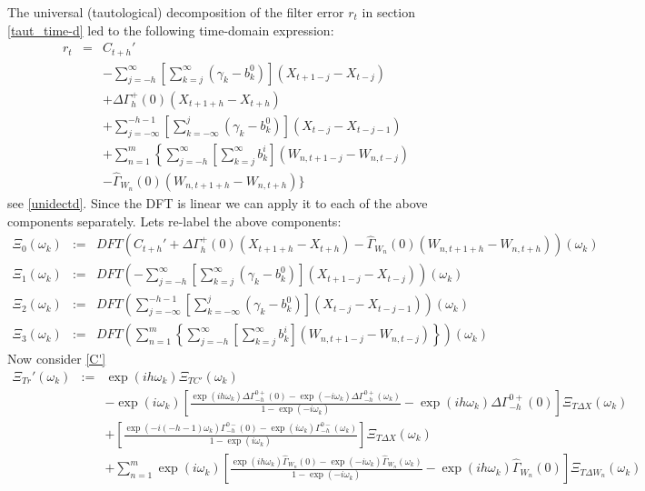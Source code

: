 \documentclass[11pt]{article}
\begin{document}
\begin{appendix}
The universal (tautological) decomposition of the filter error $r_t$ in section \ref{taut_time-d} led to the following time-domain expression:
\begin{eqnarray}
r_t&=&C_{t+h}'\nonumber\\
&&-\sum_{j=-h}^\infty
\left[\sum_{k=j}^\infty({\gamma}_{k}-b_k^0)\right]
(X_{t+1-j}-X_{t-j})\nonumber\\
&&+\Delta\Gamma_{h}^+(0)
(X_{t+1+h}-X_{t+h})\nonumber\\
&&+\sum_{j=-\infty}^{-h-1}\left[\sum_{k=-\infty}^j(\gamma_k-b_k^0)\right](X_{t-j}-X_{t-j-1})\nonumber\\
&&+\sum_{n=1}^m\left\{\sum_{j=-h}^\infty
\left[\sum_{k=j}^\infty b_k^i\right]
(W_{n,t+1-j}-W_{n,t-j})\right.\nonumber\\
&&-\hat{\Gamma}_{W_n}(0)(W_{n,t+1+h}-W_{n,t+h})\Bigg\}\nonumber
\end{eqnarray}
see \ref{unidectd}. Since the DFT is linear we can apply it to each of the above components separately. Lets re-label the above components:
\begin{eqnarray*}
\Xi_0(\omega_k)&:=&DFT\left(C_{t+h}'+\Delta\Gamma_{h}^+(0)
(X_{t+1+h}-X_{t+h})-\hat{\Gamma}_{W_n}(0)(W_{n,t+1+h}-W_{n,t+h})\right)(\omega_k)\\
\Xi_{1}(\omega_k)&:=&DFT\left(-\sum_{j=-h}^\infty
\left[\sum_{k=j}^\infty({\gamma}_{k}-b_k^0)\right]
(X_{t+1-j}-X_{t-j})\right)(\omega_k)\\
\Xi_{2}(\omega_k)&:=&DFT\left(\sum_{j=-\infty}^{-h-1}\left[\sum_{k=-\infty}^j(\gamma_k-b_k^0)\right](X_{t-j}-X_{t-j-1})\right)(\omega_k)\\
\Xi_3(\omega_k)&:=&DFT\left(\sum_{n=1}^m\left\{\sum_{j=-h}^\infty
\left[\sum_{k=j}^\infty b_k^i\right]
(W_{n,t+1-j}-W_{n,t-j})\right\}\right)(\omega_k)
\end{eqnarray*}
Now consider \ref{C'}
\begin{eqnarray}
\Xi_{Tr}'(\omega_k)&:=& \exp(ih\omega_k)\Xi_{TC'}(\omega_k)\nonumber\\
&&-\exp(i\omega_k)\left[\frac{\exp(ih\omega_k)\Delta\Gamma_{-h}^{0+}(0)-\exp(-i\omega_k)\Delta\Gamma_{-h}^{0+}(\omega_k)}{1-\exp(-i\omega_k)}-\exp(ih\omega_k)\Delta\Gamma_{-h}^{0+}(0)\right]\Xi_{T\Delta X}(\omega_k)\nonumber\\
&&+\left[\frac{\exp(-i(-h-1)\omega_k)\Gamma_{-h}^{0-}(0)-\exp(i\omega_k)\Gamma_{-h}^{0-}(\omega_k)}{1-\exp(i\omega_k)}\right]\Xi_{T\Delta X}(\omega_k)\nonumber\\
&&+\sum_{n=1}^m\exp(i\omega_k)\left[\frac{\exp(ih\omega_k)\hat{\Gamma}_{W_n}(0)-\exp(-i\omega_k)\hat{\Gamma}_{W_n}(\omega_k)}{1-\exp(-i\omega_k)}-\exp(ih\omega_k)\hat{\Gamma}_{W_n}(0)\right]\Xi_{T\Delta W_n}(\omega_k)\nonumber

\end{eqnarray}
\end{appendix}
\end{document}
